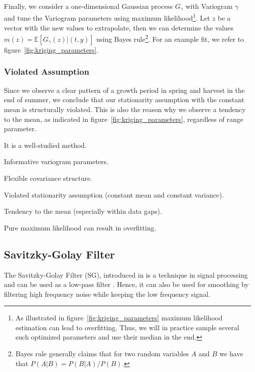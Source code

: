 		Finally, we consider a one-dimensional Gaussian process $G_\gamma$ with Variogram $\gamma$ and tune the Variogram parameters using maximum likelihood\footnote{As illustrated in figure~\ref{fig:kriging_parameters} maximum likelihood estimation can lead to overfitting. Thus, we will in practice sample several such optimized parameters and use their median in the end.}. Let $z$ be a vector with the new values to extrapolate, then we can determine the values $m(z) = \mathbb{E}\left[G_\gamma(z) | (t,y)\right]$ using Bayes rule\footnote{Bayes rule generally claims that for two random variables $A$ and $B$ we have that $P(A|B) = P(B|A) / P(B)$.}. For an example fit, we refer to figure~\ref{fig:kriging_parameters}. 

		\subsubsection*{Violated Assumption}
			Since we observe a clear pattern of a growth period in spring and harvest in the end of summer, we conclude that our stationarity assumption with the constant mean is structurally violated. This is also the reason why we observe a tendency to the mean, as indicated in figure~\ref{fig:kriging_parameters}, regardless of range parameter.

		\begin{my_pros_cons_table}{
				\item It is a well-studied method.
				\item Informative variogram parameters.
				\item Flexible covariance structure.
			}{
				\item Violated stationarity assumption (constant mean and constant variance). 
				\item Tendency to the mean (especially within data gaps).
				\item Pure maximum likelihood can result in overfitting.
			}
		\end{my_pros_cons_table}


	\subsection{Savitzky-Golay Filter}
		\label{sec:Savitzky-Golay}
		The Savitzky-Golay Filter (SG), introduced in \cite{savitzkySmoothingDifferentiationData1964} is a technique in signal processing and can be used as a low-pass filter  \citep{schaferWhatSavitzkyGolayFilter2011}. Hence, it can also be used for smoothing by filtering high frequency noise while keeping the low frequency signal.

